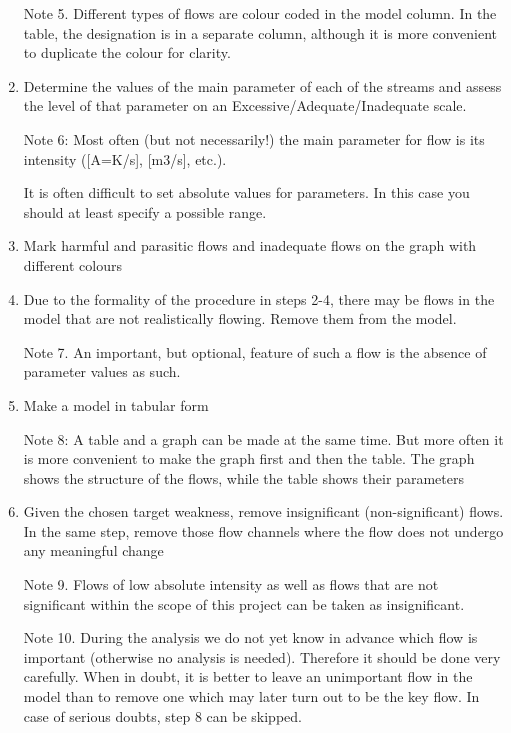 \documentclass[a4paper,11pt]{article}
\begin{document}
\begin{enumerate}
  Note 5. Different types of flows are colour coded in the model column. In
  the table, the designation is in a separate column, although it is more
  convenient to duplicate the colour for clarity.

\item Determine the values of the main parameter of each of the streams and
  assess the level of that parameter on an Excessive/Adequate/Inadequate
  scale.

  Note 6: Most often (but not necessarily!) the main parameter for flow is its
  intensity ([A=K/s], [m3/s], etc.).

  It is often difficult to set absolute values for parameters. In this case
  you should at least specify a possible range.

\item Mark harmful and parasitic flows and inadequate flows on the graph with
  different colours

\item Due to the formality of the procedure in steps 2-4, there may be flows
  in the model that are not realistically flowing. Remove them from the model.

  Note 7. An important, but optional, feature of such a flow is the absence of
  parameter values as such.

\item Make a model in tabular form

  Note 8: A table and a graph can be made at the same time. But more often it
  is more convenient to make the graph first and then the table. The graph
  shows the structure of the flows, while the table shows their parameters

\item Given the chosen target weakness, remove insignificant (non-significant)
  flows. In the same step, remove those flow channels where the flow does not
  undergo any meaningful change
  
  Note 9. Flows of low absolute intensity as well as flows that are not
  significant within the scope of this project can be taken as insignificant.

  Note 10. During the analysis we do not yet know in advance which flow is
  important (otherwise no analysis is needed). Therefore it should be done
  very carefully. When in doubt, it is better to leave an unimportant flow in
  the model than to remove one which may later turn out to be the key flow. In
  case of serious doubts, step 8 can be skipped.


\end{enumerate}
\end{document}
